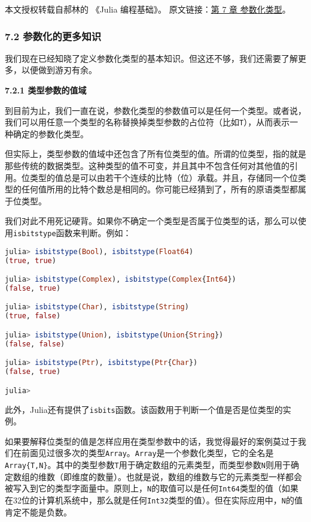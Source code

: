 
本文授权转载自郝林的 《Julia 编程基础》。 原文链接：\href{https://github.com/hyper0x/JuliaBasics/blob/master/book/ch07.md}{第 7 章 参数化类型}。


\subsubsection{7.2 参数化的更多知识}

我们现在已经知晓了定义参数化类型的基本知识。但这还不够，我们还需要了解更多，以便做到游刃有余。

\textbf{7.2.1 类型参数的值域}

到目前为止，我们一直在说，参数化类型的参数值可以是任何一个类型。或者说，我们可以用任意一个类型的名称替换掉类型参数的占位符（比如\verb|T|），从而表示一种确定的参数化类型。

但实际上，类型参数的值域中还包含了所有位类型的值。所谓的位类型，指的就是那些传统的数据类型。这种类型的值不可变，并且其中不包含任何对其他值的引用。位类型的值总是可以由若干个连续的比特（位）承载。并且，存储同一个位类型的任何值所用的比特个数总是相同的。你可能已经猜到了，所有的原语类型都属于位类型。

我们对此不用死记硬背。如果你不确定一个类型是否属于位类型的话，那么可以使用\verb|isbitstype|函数来判断。例如：
\begin{lstlisting}[language=julia]
julia> isbitstype(Bool), isbitstype(Float64)
(true, true)

julia> isbitstype(Complex), isbitstype(Complex{Int64})
(false, true)

julia> isbitstype(Char), isbitstype(String)
(true, false)

julia> isbitstype(Union), isbitstype(Union{String})
(false, false)

julia> isbitstype(Ptr), isbitstype(Ptr{Char})
(false, true)

julia> 
\end{lstlisting}

此外，Julia还有提供了\verb|isbits|函数。该函数用于判断一个值是否是位类型的实例。

如果要解释位类型的值是怎样应用在类型参数中的话，我觉得最好的案例莫过于我们在前面见过很多次的类型\verb|Array|。\verb|Array|是一个参数化类型，它的全名是\verb|Array{T,N}|。其中的类型参数\verb|T|用于确定数组的元素类型，而类型参数\verb|N|则用于确定数组的维数（即维度的数量）。也就是说，数组的维数与它的元素类型一样都会被写入到它的类型字面量中。原则上，\verb|N|的取值可以是任何\verb|Int64|类型的值（如果在32位的计算机系统中，那么就是任何\verb|Int32|类型的值）。但在实际应用中，\verb|N|的值肯定不能是负数。

